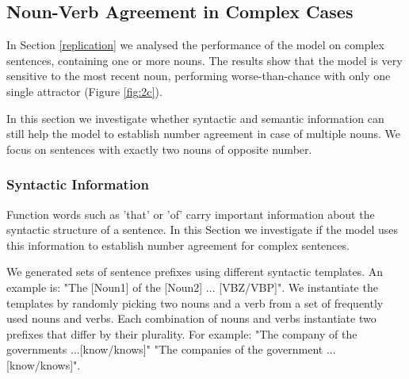 \begin{multicols}{2}

 
\subsection{Noun-Verb Agreement in Complex Cases}

In Section \ref{replication} we analysed the performance of the model
on complex sentences, containing one or more 
nouns.
The results show that the model is very
sensitive to the most recent noun,
performing worse-than-chance with only one single attractor
(Figure \ref{fig:2c}). 

In this section we investigate whether
syntactic and semantic information
can still help the model 
to establish number agreement
in case of multiple nouns.
We focus on sentences with exactly two nouns
of opposite number.


\subsubsection{Syntactic Information}

Function words such as 'that' or 'of' carry 
important information about the syntactic structure of a sentence.
In this Section we investigate if the model
uses this information to establish number agreement
for complex sentences.

We generated sets of sentence prefixes using 
different syntactic templates.
An example is:
"The [Noun1] of the [Noun2] ... [VBZ/VBP]".
We instantiate the templates by randomly
picking two nouns and a verb from a set of frequently
used nouns and verbs. 
Each combination of nouns and verbs instantiate
two prefixes that differ by their plurality.
For example:
"The company of the governments ...[know/knows]"
"The companies of the government ...[know/knows]".


\end{multicols}
